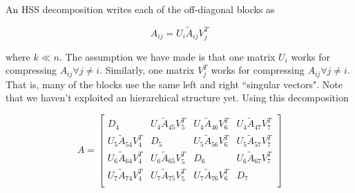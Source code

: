 An HSS decomposition writes each of the off-diagonal blocks as

\begin{equation*}
    A_{ij} = U_i \widetilde{A}_{ij} V^T_j
\end{equation*}

where $k \ll n$. The assumption we have made is that one matrix $U_i$ works for compressing $A_{ij}\forall j\neq i$. Similarly, one matrix $V_j^T$ works for compressing $A_{ij}\forall j\neq i$. That is, many of the blocks use the same left and right ``singular vectors". Note that we haven't exploited an hierarchical structure yet. Using this decomposition

\begin{equation*}
    A =
    \begin{bmatrix}
        D_4    & U_4\widetilde{A}_{45}V^T_5 & U_4\widetilde{A}_{46}V^T_6 & U_4\widetilde{A}_{47}V^T_7 \\
        U_5\widetilde{A}_{54}V^T_4 & D_5    & U_5\widetilde{A}_{56}V^T_6 & U_5\widetilde{A}_{57}V^T_7 \\
        U_6\widetilde{A}_{64}V^T_4 & U_6\widetilde{A}_{65}V^T_5 & D_6 & U_6\widetilde{A}_{67}V^T_7 \\
        U_7\widetilde{A}_{74}V^T_4 & U_7\widetilde{A}_{75}V^T_5 & U_7\widetilde{A}_{76}V^T_6 & D_7    \\
    \end{bmatrix}
\end{equation*}


